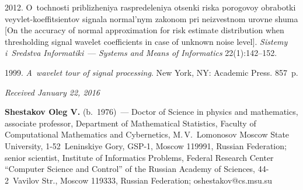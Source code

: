 \begin{multicols}{2}
{{\begin{thebibliography}{99}
 2012. O~tochnosti priblizheniya raspredeleniya otsenki 
riska porogovoy obrabotki veyvlet-ko\-ef\-fi\-tsi\-en\-tov signala normal'nym zakonom pri 
neizvestnom urovne shuma [On the accuracy of normal approximation for risk estimate 
distribution when thresholding signal wavelet coefficients in case of unknown 
noise level]. \textit{Sistemy i~Sredstva Informatiki}~--- \textit{Systems and Means of 
Informatics} 22(1):142--152.

 1999. \textit{A~wavelet tour of signal processing}. 
New York, NY:  Academic Press. 857~p.

\end{thebibliography}

 }
 }

\end{multicols}

\vspace*{-3pt}

\hfill{\small\textit{Received January 22, 2016}}

\Contrl

\noindent
\textbf{Shestakov Oleg V.} (b.\ 1976)~--- 
Doctor of Science in physics and mathematics, associate professor, 
Department of Mathematical Statistics, Faculty of Computational Mathematics 
and Cybernetics, M.\,V.~Lomonosov Moscow State University, 1-52~Leninskiye Gory, 
GSP-1, Moscow 119991, Russian Federation; senior scientist, 
Institute of Informatics Problems, Federal Research Center 
``Computer Science and Control''
of the Russian Academy of Sciences, 44-2~Vavilov Str., Moscow 119333, 
Russian Federation; oshestakov@cs.msu.su


\label{end\stat}


\renewcommand{\bibname}{\protect\rm Литература}